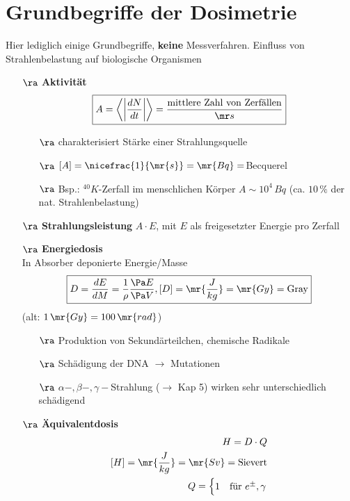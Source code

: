 \section{Grundbegriffe der Dosimetrie}
Hier lediglich einige Grundbegriffe, \textbf{keine} Messverfahren.
Einfluss von Strahlenbelastung auf biologische Organismen
\begin{itemize}
\item[$\ra$] \textbf{Aktivität}
\begin{align}
\boxed{A=\left\langle\left|\frac{dN}{dt}\right|\right\rangle=
\frac{\text{mittlere Zahl von Zerfällen}}{\mr s}}
\end{align}
\begin{itemize}
\item[$\ra$] charakterisiert Stärke einer Strahlungsquelle
\item[$\ra$] $[A]=\nicefrac{1}{\mr{s}}=\mr{Bq}=$Becquerel
\item[$\ra$] Bsp.: $^{40}K$-Zerfall im menschlichen Körper $A\sim 10^4\,Bq$ (ca. $10\,\%$ der nat. Strahlenbelastung)\\
\end{itemize}
\item[$\ra$] \textbf{Strahlungsleistung} $A\cdot E$, mit $E$ als freigesetzter Energie pro Zerfall
\item[$\ra$] \textbf{Energiedosis}\\
In Absorber deponierte Energie/Masse
\begin{align}
\boxed{D=\frac{dE}{dM}=\frac{1}{\rho}\frac{\Pa E}{\Pa V},[D]=\mr{\frac{J}{kg}}=\mr{Gy}=\text{Gray}}
\end{align}
(alt: $1\,\mr{Gy}=100\,\mr{rad}$)
\begin{itemize}
\item[$\ra$] Produktion von Sekundärteilchen, chemische Radikale
\item[$\ra$] Schädigung der DNA $\rightarrow$ Mutationen
\item[$\ra$] $\alpha-,\beta-,\gamma-$Strahlung ($\rightarrow$ Kap 5) wirken sehr unterschiedlich schädigend
\end{itemize}
\item[$\ra$]\textbf{Äquivalentdosis}
\begin{align}
\begin{split}
H=D\cdot Q\\
[H]=\mr{\frac{J}{kg}}=\mr{Sv}=\text{Sievert}\\
Q=\begin{cases}
1 & \text{für } e^\pm,\gamma\\

\end{cases}
\end{split}
\end{align}
\end{itemize}
